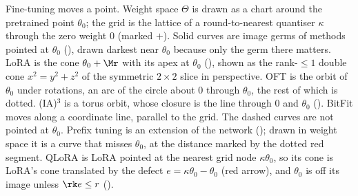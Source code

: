 Fine-tuning moves a point. Weight space $\Theta$ is drawn as a chart around the pretrained point $\theta_0$; the grid is the lattice of a round-to-nearest quantiser $\kappa$ through the zero weight $0$ (marked $+$). Solid curves are image germs of methods pointed at $\theta_0$ (), drawn darkest near $\theta_0$ because only the germ there matters. LoRA \citep{hu2021lora} is the cone $\theta_0+\Mr$ with its apex at $\theta_0$ (), shown as the rank-$\le1$ double cone $x^2=y^2+z^2$ of the symmetric $2\times2$ slice in perspective. OFT \citep{qiu2023controlling} is the orbit of $\theta_0$ under rotations, an arc of the circle about $0$ through $\theta_0$, the rest of which is dotted. (IA)$^3$ \citep{liu2022few} is a torus orbit, whose closure is the line through $0$ and $\theta_0$ (). BitFit \citep{benzaken2021bitfit} moves along a coordinate line, parallel to the grid. The dashed curves are not pointed at $\theta_0$. Prefix tuning \citep{li2021prefix} is an extension of the network (); drawn in weight space it is a curve that misses $\theta_0$, at the distance marked by the dotted red segment. QLoRA \citep{dettmers2023qlora} is LoRA pointed at the nearest grid node $\kappa\theta_0$, so its cone is LoRA's cone translated by the defect $e=\kappa\theta_0-\theta_0$ (red arrow), and $\theta_0$ is off its image unless $\rk e\le r$ ().
